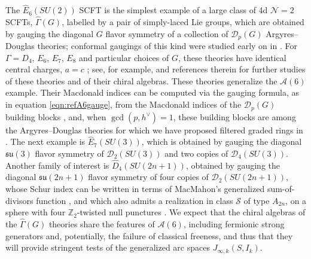 \documentclass[12pt]{article}
\numberwithin{equation}{section}
\numberwithin{figure}{section}
\theoremstyle{plain}
\theoremstyle{definition}
\begin{document}
The $\widehat{E}_6(SU(2))$ SCFT is the simplest example of a large class of 4d $\mathcal{N}=2$ SCFTs, $\widehat{\Gamma}(G)$, labelled by a pair of simply-laced Lie groups, which are obtained by gauging the diagonal $G$ flavor symmetry of a collection of $\mathcal{D}_p(G)$ Argyres--Douglas theories; conformal gaugings of this kind were studied early on in \cite{Cecotti:2012jx,Cecotti:2013lda}. For $\Gamma = D_4$, $E_6$, $E_7$, $E_8$ and particular choices of $G$, these theories have identical central charges, $a = c$ \cite{Kang:2021lic}; see, for example, \cite{Buican:2016arp,Buican:2020moo,Kang:2022vab,Jiang:2024baj,Pan:2025gzh} and references therein for further studies of these theories and of their chiral algebras. These theories generalize the $\mathcal{A}(6)$ example. Their Macdonald indices can be computed via the gauging formula, as in equation \eqref{eqn:refA6gauge}, from the Macdonald indices of the $\mathcal{D}_p(G)$ building blocks \cite{Song:2015wta}, and, when $\gcd(p, h^\vee) = 1$, these building blocks are among the Argyres--Douglas theories for which we have proposed filtered graded rings in \cite{Kang:2026ney}. The next example is $\widehat{E}_7(SU(3))$, which is obtained by gauging the diagonal $\mathfrak{su}(3)$ flavor symmetry of $\mathcal{D}_2(SU(3))$ and two copies of $\mathcal{D}_4(SU(3))$. Another family of interest is $\widehat{D}_4(SU(2n+1))$, obtained by gauging the diagonal $\mathfrak{su}(2n+1)$ flavor symmetry of four copies of $\mathcal{D}_2(SU(2n+1))$, whose Schur index can be written in terms of MacMahon's generalized sum-of-divisors function \cite{Kang:2021lic}, and which also admits a realization in class $\mathcal{S}$ of type $A_{2n}$, on a sphere with four $\mathbb{Z}_2$-twisted null punctures \cite{Beem:2020pry,Beratto:2020wmn,Kang:2022zsl}. We expect that the chiral algebras of the $\widehat{\Gamma}(G)$ theories share the features of $\mathcal{A}(6)$, including fermionic strong generators and, potentially, the failure of classical freeness, and thus that they will provide stringent tests of the generalized arc spaces $J_{\infty,k}(S, I_k)$.
\end{document}
